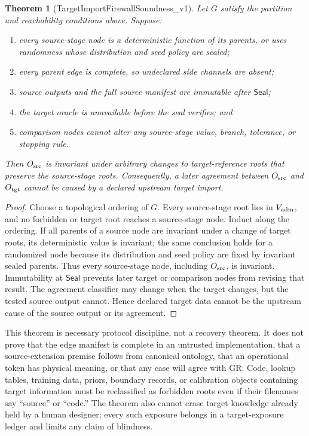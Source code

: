 \documentclass[11pt]{article}
\newtheorem{theorem}{Theorem}
\newcommand{\Seal}{\mathsf{Seal}}
\begin{document}
\begin{theorem}[TargetImportFirewallSoundness\_v1]
Let \(G\) satisfy the partition and reachability conditions above.  Suppose:
\begin{enumerate}
\item every source-stage node is a deterministic function of its parents, or
      uses randomness whose distribution and seed policy are sealed;
\item every parent edge is complete, so undeclared side channels are absent;
\item source outputs and the full source manifest are immutable after
      \(\Seal\);
\item the target oracle is unavailable before the seal verifies; and
\item comparison nodes cannot alter any source-stage value, branch, tolerance,
      or stopping rule.
\end{enumerate}
Then \(O_{\rm src}\) is invariant under arbitrary changes to target-reference
roots that preserve the source-stage roots.  Consequently, a later agreement
between \(O_{\rm src}\) and \(O_{\rm tgt}\) cannot be caused by a declared
upstream target import.
\end{theorem}

\begin{proof}
Choose a topological ordering of \(G\).  Every source-stage root lies in
\(V_{\rm adm}\), and no forbidden or target root reaches a source-stage node.
Induct along the ordering.  If all parents of a source node are invariant
under a change of target roots, its deterministic value is invariant; the
same conclusion holds for a randomized node because its distribution and
seed policy are fixed by invariant sealed parents.  Thus every source-stage
node, including \(O_{\rm src}\), is invariant.  Immutability at \(\Seal\)
prevents later target or comparison nodes from revising that result.  The
agreement classifier may change when the target changes, but the tested source
output cannot.  Hence declared target data cannot be the upstream cause of the
source output or its agreement.
\end{proof}

This theorem is necessary protocol discipline, not a recovery theorem.  It
does not prove that the edge manifest is complete in an untrusted
implementation, that a source-extension premise follows from canonical
ontology, that an operational token has physical meaning, or that any case
will agree with GR.  Code, lookup tables, training data, priors, boundary
records, or calibration objects containing target information must be
reclassified as forbidden roots even if their filenames say ``source'' or
``code.''  The theorem also cannot erase target knowledge already held by a
human designer; every such exposure belongs in a target-exposure ledger and
limits any claim of blindness.
\end{document}
